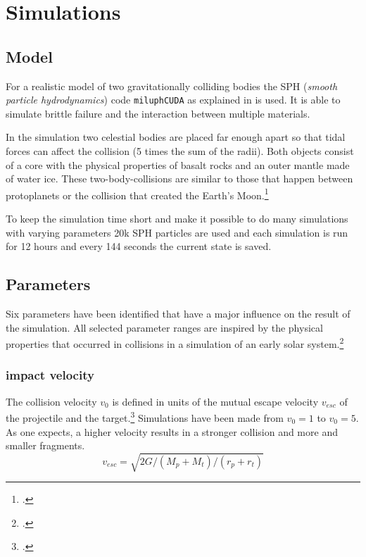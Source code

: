 \chapter{Simulations}

\section{Model}

For a realistic model of two gravitationally colliding bodies the SPH (\textit{smooth particle hydrodynamics}) code \texttt{miluphCUDA} as explained in \cite{Schaefer2016} is used. It is able to simulate brittle failure and the interaction between multiple materials. 

In the simulation two celestial bodies are placed far enough apart so that tidal forces can affect the collision (5 times the sum of the radii). Both objects consist of a core with the physical properties of basalt rocks and an outer mantle made of water ice. These two-body-collisions are similar to those that happen between protoplanets or the collision that created the Earth's Moon.\footcite{dvorakMoon}

To keep the simulation time short and make it possible to do many simulations with varying parameters 20k SPH particles are used and each simulation is run for 12 hours and every 144 seconds the current state is saved.

\section{Parameters}
\label{sec:parameters}

Six parameters have been identified that have a major influence on the result of the simulation. All selected parameter ranges are inspired by the physical properties that occurred in collisions in a simulation of an early solar system.\footcite{CollisionParameters}

\subsection{impact velocity}

The collision velocity $v_0$ is defined in units of the mutual escape velocity $v_{esc}$ of the projectile and the target.\footcite{MaindlSummary} Simulations have been made from $v_0=1$ to $v_0=5$. As one expects, a higher velocity results in a stronger collision and more and smaller fragments.
\begin{equation}
	v_{esc}=\sqrt{2G/(M_p+M_t)/(r_p+r_t)}
\end{equation}

